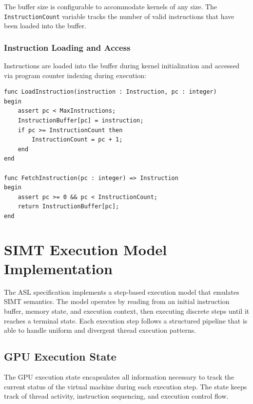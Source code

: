 The buffer size is configurable to accommodate kernels of any size. The
\lstinline{InstructionCount} variable tracks the number of valid instructions
that have been loaded into the buffer.

\subsubsection{Instruction Loading and Access}
\label{subsubsec:instruction_access}

Instructions are loaded into the buffer during kernel initialization and
accessed via program counter indexing during execution:

\begin{lstlisting}[caption={Instruction Buffer Access Pattern}, label={lst:instruction_access}]
func LoadInstruction(instruction : Instruction, pc : integer)
begin
    assert pc < MaxInstructions;
    InstructionBuffer[pc] = instruction;
    if pc >= InstructionCount then
        InstructionCount = pc + 1;
    end
end

func FetchInstruction(pc : integer) => Instruction
begin
    assert pc >= 0 && pc < InstructionCount;
    return InstructionBuffer[pc];
end
\end{lstlisting}

\section{SIMT Execution Model Implementation}
\label{sec:simt_execution}
The ASL specification implements a step-based execution model that emulates
SIMT semantics. The model operates by reading from an initial instruction
buffer, memory state, and execution context, then executing discrete steps
until it reaches a terminal state. Each execution step follows a structured
pipeline that is able to handle uniform and divergent thread execution
patterns.

\subsection{GPU Execution State}
\label{subsec:gpu_state}
The GPU execution state encapsulates all information necessary to track the
current status of the virtual machine during each execution step. The state
keeps track of thread activity, instruction sequencing, and execution control
flow.

